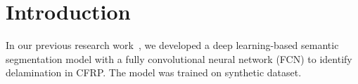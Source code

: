 \section{Introduction}
In our previous research work~\cite{ijjeh2021}, we developed a deep learning-based semantic segmentation model with a fully convolutional neural network (FCN) to identify delamination in CFRP.
The model was trained on synthetic dataset.


